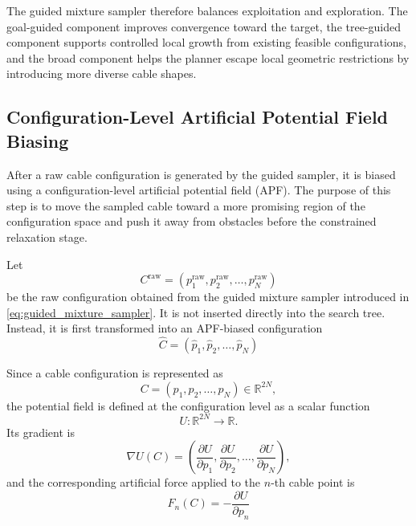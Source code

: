 \documentclass{pas}
\begin{document}
The guided mixture sampler therefore balances exploitation and exploration. The
goal-guided component improves convergence toward the target, the tree-guided
component supports controlled local growth from existing feasible
configurations, and the broad component helps the planner escape local
geometric restrictions by introducing more diverse cable shapes.
\subsection{Configuration-Level Artificial Potential Field Biasing}
\label{subsec:gcr_config_apf_sampling}

After a raw cable configuration is generated by the guided sampler, it is biased
using a configuration-level artificial potential field (APF). The purpose of
this step is to move the sampled cable toward a more promising region of the
configuration space and push it away from obstacles before the constrained relaxation stage.

Let
\[
C^{\mathrm{raw}}
=
(p_1^{\mathrm{raw}},p_2^{\mathrm{raw}},\ldots,p_N^{\mathrm{raw}})
\]
be the raw configuration obtained from the guided mixture sampler introduced in
\eqref{eq:guided_mixture_sampler}. It is not inserted directly into the search tree. Instead, it is first transformed into an APF-biased configuration
\[
\widehat{C}
=
(\widehat{p}_1,\widehat{p}_2,\ldots,\widehat{p}_N)
\]

Since a cable configuration is represented as
\begin{equation}
C
=
(p_1,p_2,\ldots,p_N)
\in
\mathbb{R}^{2N},
\label{eq:gcr_configuration_for_apf}
\end{equation}
the potential field is defined at the configuration level as a scalar function
\begin{equation}
U:\mathbb{R}^{2N}\rightarrow\mathbb{R}.
\label{eq:gcr_apf_mapping}
\end{equation}
Its gradient is
\begin{equation}
\nabla U(C)
=
\left(
\frac{\partial U}{\partial p_1},
\frac{\partial U}{\partial p_2},
\ldots,
\frac{\partial U}{\partial p_N}
\right),
\label{eq:gcr_apf_gradient_definition}
\end{equation}
and the corresponding artificial force applied to the $n$-th cable point is
\begin{equation}
F_n(C)
=
-
\frac{\partial U}{\partial p_n}
\label{eq:gcr_pointwise_apf_force}
\end{equation}
\end{document}
